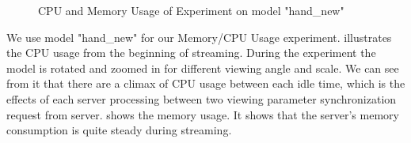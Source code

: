 \begin{figure}
\centering
{}
\label{fig:hand_new_cpu_mem}
\caption{CPU and Memory Usage of Experiment on model "hand\_new"}
\end{figure}
We use model "hand\_new" for our Memory/CPU Usage experiment.  illustrates the CPU usage from the beginning of streaming. During the experiment the model is rotated and zoomed in for different viewing angle and scale. We can see from it that there are a climax of CPU usage between each idle time, which is the effects of each server processing between two viewing parameter synchronization request from server.  shows the memory usage. It shows that the server's memory consumption is quite steady during streaming. 



